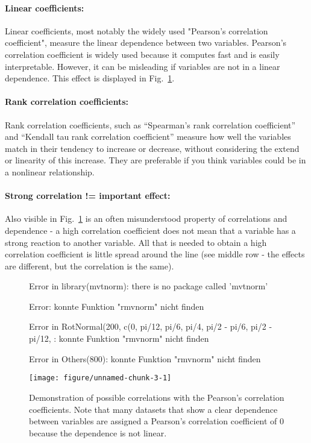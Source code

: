 \documentclass[a4paper,twoside]{tufte-book}\usepackage[]{graphicx}\usepackage[]{color}
\makeatletter
\def\maxwidth{ %
	\ifdim\Gin@nat@width>\linewidth
	\linewidth
	\else
	\Gin@nat@width
	\fi
}
\makeatother
\begin{document}
\paragraph{Linear coefficients:}Linear coefficients, most notably the widely used "Pearson's correlation coefficient", measure the linear dependence between two variables. Pearson's correlation coefficient is widely used because it computes fast and is easily interpretable. However, it can be misleading if variables are not in a linear dependence. This effect is displayed in Fig.~\ref{fig: correlation}.

\paragraph{Rank correlation coefficients:} Rank correlation coefficients, such as ``Spearman's rank correlation coefficient'' and ``Kendall tau rank correlation coefficient'' measure how well the variables match in their tendency to increase or decrease, without considering the extend or linearity of this increase. They are preferable if you think variables could be in a nonlinear relationship.

\paragraph{Strong correlation != important effect:} Also visible in Fig.~\ref{fig: correlation} is an often misunderstood property of correlations and dependence - a high correlation coefficient does not mean that a variable has a strong reaction to another variable. All that is needed to obtain a high correlation coefficient is little spread around the line (see middle row - the effects are different, but the correlation is the same). 


\begin{figure}[htbp]
\begin{center}
\begin{Schunk}
\begin{Soutput}
Error in library(mvtnorm): there is no package called 'mvtnorm'
\end{Soutput}
\begin{Soutput}
Error: konnte Funktion "rmvnorm" nicht finden
\end{Soutput}
\begin{Soutput}
Error in RotNormal(200, c(0, pi/12, pi/6, pi/4, pi/2 - pi/6, pi/2 - pi/12, : konnte Funktion "rmvnorm" nicht finden
\end{Soutput}
\begin{Soutput}
Error in Others(800): konnte Funktion "rmvnorm" nicht finden
\end{Soutput}

\texttt{[image: figure/unnamed-chunk-3-1]} \end{Schunk}
\caption{Demonstration of possible correlations with the Pearson's correlation coefficients. Note that many datasets that show a clear dependence between variables are assigned a Pearson's correlation coefficient of 0 because the dependence is not linear.}
\label{fig: correlation}
\end{center}
\end{figure}
\end{document}

